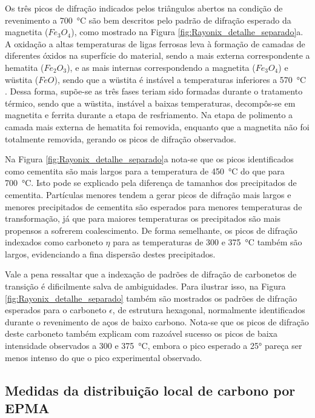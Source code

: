 Os três picos de difração indicados pelos triângulos abertos na condição de revenimento a \SI{700}{\degreeCelsius} são bem descritos pelo padrão de difração esperado da magnetita ($Fe_3O_4$)\cite{Fleet1986}, como mostrado na Figura \ref{fig:Rayonix_detalhe_separado}a. 
A oxidação a altas temperaturas de ligas ferrosas leva à formação de camadas de diferentes óxidos na superfície do material, sendo a mais externa correspondente a hematita ($Fe_2O_3$), e as mais internas correspondendo a magnetita ($Fe_3O_4$) e wüstita ($FeO$), sendo que a wüstita é instável a temperaturas inferiores a \SI{570}{\degreeCelsius} \cite{West2005}. Dessa forma, supõe-se as três fases teriam sido formadas durante o tratamento térmico, sendo que a wüstita, instável a baixas temperaturas, decompôs-se em magnetita e ferrita durante a etapa de resfriamento. Na etapa de polimento a camada mais externa de hematita foi removida, enquanto que a magnetita não foi totalmente removida, gerando os picos de difração observados.

Na Figura \ref{fig:Rayonix_detalhe_separado}a nota-se que os picos identificados como cementita são mais largos para a temperatura de \SI{450}{\degreeCelsius} do que para \SI{700}{\degreeCelsius}. Isto pode se explicado pela diferença de tamanhos dos precipitados de cementita. Partículas menores tendem a gerar picos de difração mais largos\cite{Cullity2001} e menores precipitados de cementita são esperados para menores temperaturas de transformação, já que para maiores temperaturas os precipitados são mais propensos a sofrerem coalescimento. De forma semelhante, os picos de difração indexados como carboneto $\eta$ para as temperaturas de 300 e \SI{375}{\degreeCelsius} também são largos, evidenciando a fina dispersão destes precipitados.

Vale a pena ressaltar que a indexação de padrões de difração de carbonetos de transição é dificilmente salva de ambiguidades. Para ilustrar isso, na Figura \ref{fig:Rayonix_detalhe_separado} também são mostrados os padrões de difração esperados para o carboneto $\epsilon$\cite{Nagakura1959}, de estrutura hexagonal, normalmente identificados durante o revenimento de aços de baixo carbono. Nota-se que os picos de difração deste carboneto também explicam com razoável sucesso os picos de baixa intensidade observados a 300 e \SI{375}{\degreeCelsius}, embora o pico esperado a 25° pareça ser menos intenso do que o pico experimental observado.

\subsection{Medidas da distribuição local de carbono por EPMA}

